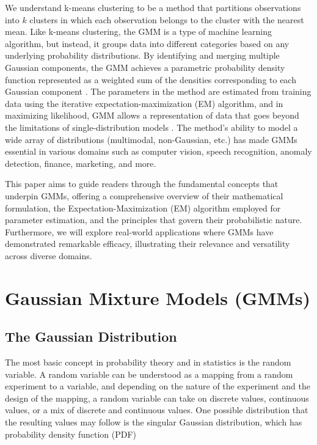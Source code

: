 \documentclass[12pt]{article}
\begin{document}
We understand k-means clustering to be a method that partitions
observations into \(k\) clusters in which each observation belongs to
the cluster with the nearest mean. Like k-means clustering, the GMM is a
type of machine learning algorithm, but instead, it groups data into
different categories based on any underlying probability distributions.
By identifying and merging multiple Gaussian components, the GMM
achieves a parametric probability density function represented as a
weighted sum of the densities corresponding to each Gaussian component
\citep{reynolds2009gaussian}. The parameters in the method are estimated
from training data using the iterative expectation-maximization (EM)
algorithm, and in maximizing likelihood, GMM allows a representation of
data that goes beyond the limitations of single-distribution models
\citep{bouguila2020mixture}. The method's ability to model a wide array
of distributions (multimodal, non-Gaussian, etc.) has made GMMs
essential in various domains such as computer vision, speech
recognition, anomaly detection, finance, marketing, and more.

This paper aims to guide readers through the fundamental concepts that
underpin GMMs, offering a comprehensive overview of their mathematical
formulation, the Expectation-Maximization (EM) algorithm employed for
parameter estimation, and the principles that govern their probabilistic
nature. Furthermore, we will explore real-world applications where GMMs
have demonstrated remarkable efficacy, illustrating their relevance and
versatility across diverse domains.

\hypertarget{gaussian-mixture-models-gmms}{%
\section{Gaussian Mixture Models
(GMMs)}\label{gaussian-mixture-models-gmms}}

\label{sec:exposition}

\hypertarget{the-gaussian-distribution}{%
\subsection{The Gaussian Distribution}\label{the-gaussian-distribution}}

The most basic concept in probability theory and in statistics is the
random variable. A random variable can be understood as a mapping from a
random experiment to a variable, and depending on the nature of the
experiment and the design of the mapping, a random variable can take on
discrete values, continuous values, or a mix of discrete and continuous
values. One possible distribution that the resulting values may follow
is the singular Gaussian distribution, which has probability density
function (PDF)
\end{document}
